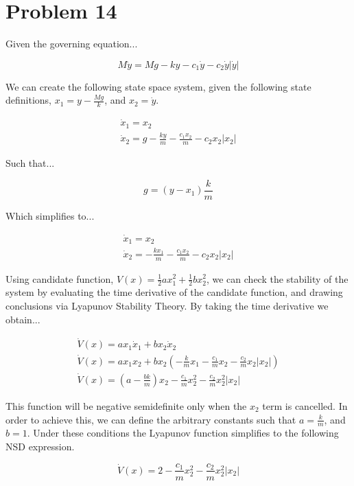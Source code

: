 \section*{Problem 14}

Given the governing equation...

$$
M \ddot{y}=M g-k y-c_{1} \dot{y}-c_{2} \dot{y}|\dot{y}|
$$



\noindent We can create the following state space system, given the following state definitions, $x_1 = y - \frac{Mg}{k}$, and $x_2=\dot{y}$.



$$
\begin{array}{l}
\dot{x}_{1}=x_{2} \\
\dot{x}_{2}= g -\frac{ky}{m} - \frac{c_1x_2}{m} - c_2x_2|x_2|
\end{array}
$$

\noindent Such that...

$$
g = (y - x_1)\frac{k}{m}
$$

\noindent Which simplifies to...

$$
\begin{array}{l}
\dot{x}_{1}=x_{2} \\
\dot{x}_{2}= -\frac{kx_1}{m} - \frac{c_1x_2}{m} - c_2x_2|x_2|
\end{array}
$$

\noindent Using candidate function, $V(x)=\frac{1}{2} ax_{1}^{2}+\frac{1}{2} bx_{2}^{2}$, we can check the stability of the system by evaluating the time derivative of the candidate function, and drawing conclusions via Lyapunov Stability Theory. By taking the time derivative we obtain...

$$
\begin{array}{l}
\dot{V}(x)=ax_{1} \dot{x}_{1}+bx_{2} \dot{x}_{2} \\
\dot{V}(x)=ax_{1}x_2 + bx_2 \left( -\frac{k}{m}x_1 -\frac{c_1}{m}x_2 - \frac{c_2}{m}x_2 |x_2| \right) \\
\dot{V}(x)=\left(a -\frac{bk}{m}\right) x_2 - \frac{c_1}{m}x_2^2 - \frac{c_2}{m}x_2^2|x_2|
\end{array}
$$

 \noindent This function will be negative semidefinite only when the $ x_{2} $ term is cancelled. In order to achieve this, we can define the arbitrary constants such that $a = \frac{k}{m}$, and $b=1$. Under these conditions the Lyapunov function simplifies to the following NSD expression.

$$
\dot{V}(x)=2 - \frac{c_1}{m}x_2^2 - \frac{c_2}{m}x_2^2|x_2|
$$


